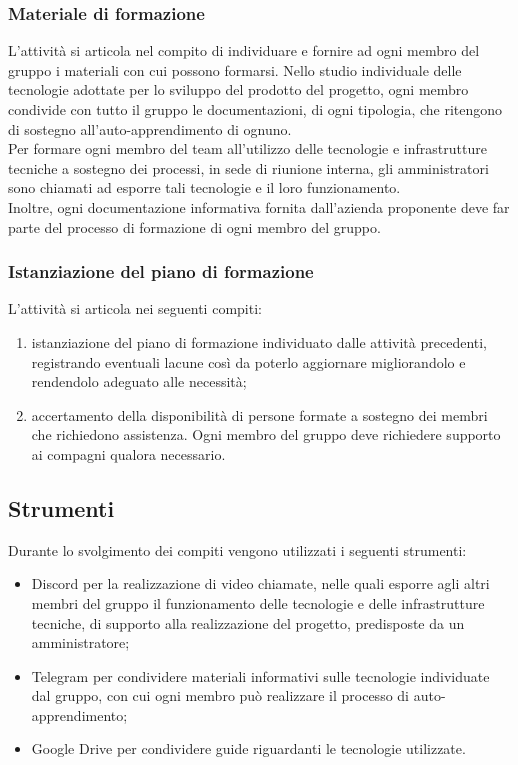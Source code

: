 \subsubsection{Materiale di formazione}
L'attività si articola nel compito di individuare e fornire ad ogni membro del gruppo i materiali con cui possono formarsi. Nello studio individuale delle tecnologie adottate per lo sviluppo del prodotto del progetto, ogni membro condivide con tutto il gruppo le documentazioni, di ogni tipologia, che ritengono di sostegno all'auto-apprendimento di ognuno.\\Per formare ogni membro del team all'utilizzo delle tecnologie e  infrastrutture tecniche a sostegno dei processi, in sede di riunione interna, gli amministratori sono chiamati ad esporre tali tecnologie e il loro funzionamento.\\Inoltre, ogni documentazione informativa fornita dall'azienda proponente deve far parte del processo di formazione di ogni membro del gruppo.
\subsubsection{Istanziazione del piano di formazione}
L'attività si articola nei seguenti compiti:
\begin{enumerate}
    \item istanziazione del piano di formazione individuato dalle attività precedenti, registrando eventuali lacune così da poterlo aggiornare migliorandolo e rendendolo adeguato alle necessità;
    \item accertamento della disponibilità di persone formate a sostegno dei membri che richiedono assistenza. Ogni membro del gruppo deve richiedere supporto ai compagni qualora necessario.
\end{enumerate}
\subsection{Strumenti}
Durante lo svolgimento dei compiti vengono utilizzati i seguenti strumenti:
\begin{itemize}
    \item Discord per la realizzazione di video chiamate, nelle quali esporre agli altri membri del gruppo il funzionamento delle tecnologie e delle infrastrutture tecniche, di supporto alla realizzazione del progetto, predisposte da un amministratore;
    \item Telegram per condividere materiali informativi sulle tecnologie individuate dal gruppo, con cui ogni membro può realizzare il processo di auto-apprendimento;
    \item Google Drive per condividere guide riguardanti le tecnologie utilizzate.
\end{itemize}
